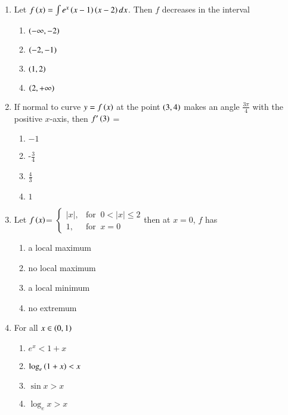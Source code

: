 \documentclass[journal]{IEEEtran}
\begin{document}
\begin{enumerate}[start=9]
\item Let $f\left(x\right)=\int e^x\left(x-1\right)\left(x-2\right)dx$. Then $f$ decreases in the interval 
\hfill {}
\begin{multicols}{4}
\begin{enumerate}
    \item $\left(-\infty,-2\right)$
    \item $\left(-2,-1\right)$
    \item $\left(1,2\right)$
    \item $\left(2,+\infty\right)$
\end{enumerate}
\end{multicols}
\item If normal to curve $y=f\left(x\right)$ at the point $\left(3,4\right)$ makes an angle $\frac{3\pi}{4}$ with the positive $x$-axis, then $f^{\prime}\left(3\right)$ = \hfill{}
\begin{multicols}{4}
\begin{enumerate}
    \item $-1$
    \item -$\frac{3}{4}$
    \item $\frac{4}{3}$
    \item $1$
\end{enumerate}
\end{multicols}
\item Let $f\left(x\right)$=
$\begin{cases}
|x|, & \text{for } \ 0<|x| \leq 2\\ 
1, & \text{for }\  x=0
\end{cases}$then at $x=0$, $f$ has
\hfill {}
\begin{multicols}{2}
\begin{enumerate}
    \item a local maximum
    \item no local maximum
    \item a local minimum
    \item no extremum
\end{enumerate}
\end{multicols}
\item For all $x\in\left(0,1\right)$
\hfill {}
\begin{multicols}{4}
\begin{enumerate}
    \item $e^{x} <1+x$
    \item $\log_e{\left(1+x\right)} < x$
    \item $ \sin{x} > x$
    \item $ \log_e{x} > x $

\end{enumerate}
\end{multicols}
\end{enumerate}
\end{document}
